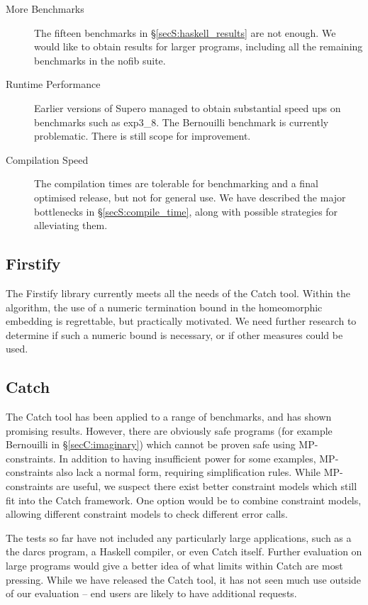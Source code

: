 \begin{description}
\item[More Benchmarks] The fifteen benchmarks in \S\ref{secS:haskell_results} are not enough. We would like to obtain results for larger programs, including all the remaining benchmarks in the nofib suite.
\item[Runtime Performance] Earlier versions of Supero \cite{me:supero_ifl} managed to obtain substantial speed ups on benchmarks such as exp3\_8. The Bernouilli benchmark is currently problematic. There is still scope for improvement.
\item[Compilation Speed] The compilation times are tolerable for benchmarking and a final optimised release, but not for general use. We have described the major bottlenecks in \S\ref{secS:compile_time}, along with possible strategies for alleviating them.
\end{description}

\subsection{Firstify}

The Firstify library currently meets all the needs of the Catch tool. Within the algorithm, the use of a numeric termination bound in the homeomorphic embedding is regrettable, but practically motivated. We need further research to determine if such a numeric bound is necessary, or if other measures could be used.

\subsection{Catch}

The Catch tool has been applied to a range of benchmarks, and has shown promising results. However, there are obviously safe programs (for example Bernouilli in \S\ref{secC:imaginary}) which cannot be proven safe using MP-constraints. In addition to having insufficient power for some examples, MP-constraints also lack a normal form, requiring simplification rules. While MP-constraints are useful, we suspect there exist better constraint models which still fit into the Catch framework. One option would be to combine constraint models, allowing different constraint models to check different error calls.

The tests so far have not included any particularly large applications, such as a the darcs program, a Haskell compiler, or even Catch itself. Further evaluation on large programs would give a better idea of what limits within Catch are most pressing. While we have released the Catch tool, it has not seen much use outside of our evaluation -- end users are likely to have additional requests.

